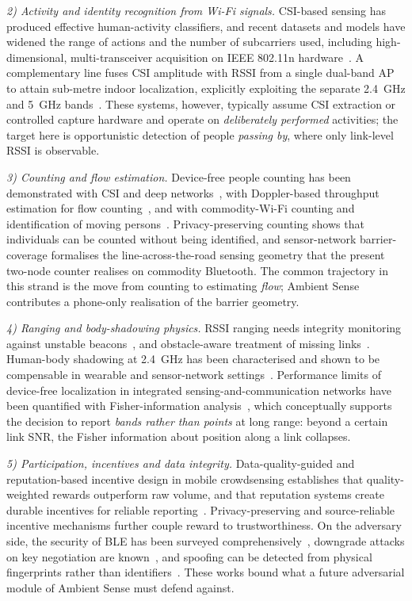 \documentclass[journal,10pt]{IEEEtran}
\begin{document}
\textit{2) Activity and identity recognition from Wi-Fi signals.} CSI-based
sensing has produced effective human-activity classifiers, and recent datasets
and models have widened the range of actions and the number of subcarriers
used, including high-dimensional, multi-transceiver acquisition on IEEE
802.11n hardware~\cite{wong2024}. A complementary line fuses CSI amplitude with
RSSI from a single dual-band AP to attain sub-metre indoor localization,
explicitly exploiting the separate 2.4~GHz and 5~GHz bands~\cite{sanchez2020}.
These systems, however, typically assume CSI extraction or controlled capture
hardware and operate on \emph{deliberately performed} activities; the target
here is opportunistic detection of people \emph{passing by}, where only
link-level RSSI is observable.

\textit{3) Counting and flow estimation.} Device-free people counting has been
demonstrated with CSI and deep networks~\cite{khan2023}, with Doppler-based
throughput estimation for flow counting~\cite{zhou2020}, and with commodity-Wi-Fi
counting and identification of moving persons~\cite{dmip2023}. Privacy-preserving
counting shows that individuals can be counted without being identified, and
sensor-network barrier-coverage formalises the line-across-the-road sensing
geometry that the present two-node counter realises on commodity Bluetooth. The
common trajectory in this strand is the move from counting to estimating
\emph{flow}; Ambient Sense contributes a phone-only realisation of the barrier
geometry.

\textit{4) Ranging and body-shadowing physics.} RSSI ranging needs integrity
monitoring against unstable beacons~\cite{ramirez2021,bai2020}, and
obstacle-aware treatment of missing links~\cite{bai2020}. Human-body shadowing
at 2.4~GHz has been characterised and shown to be compensable in wearable and
sensor-network settings~\cite{januszkiewicz2018}. Performance limits of
device-free localization in integrated sensing-and-communication networks have
been quantified with Fisher-information analysis~\cite{li2024}, which
conceptually supports the decision to report \emph{bands rather than points} at
long range: beyond a certain link SNR, the Fisher information about position
along a link collapses.

\textit{5) Participation, incentives and data integrity.} Data-quality-guided
and reputation-based incentive design in mobile crowdsensing establishes that
quality-weighted rewards outperform raw volume, and that reputation systems
create durable incentives for reliable
reporting~\cite{zhang2022,wang2018}. Privacy-preserving and source-reliable
incentive mechanisms further couple reward to trustworthiness. On the adversary
side, the security of BLE has been surveyed comprehensively~\cite{casar2022},
downgrade attacks on key negotiation are known~\cite{antonioli2020}, and
spoofing can be detected from physical fingerprints rather than
identifiers~\cite{cai2024}. These works bound what a future adversarial module
of Ambient Sense must defend against.
\end{document}
